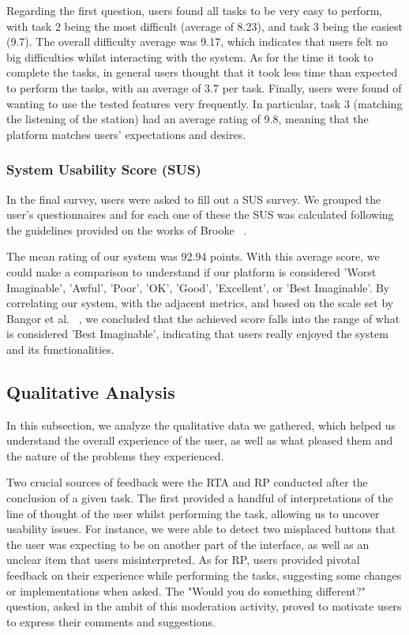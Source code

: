 {Regarding the first question, users found all tasks to be very easy to perform, with task 2 being the most difficult (average of 8.23), and task 3 being the easiest (9.7). The overall difficulty average was 9.17, which indicates that users felt no big difficulties whilst interacting with the system. As for the time it took to complete the tasks, in general users thought that it took less time than expected to perform the tasks, with an average of 3.7 per task. Finally, users were found of wanting to use the tested features very frequently. In particular, task 3 (matching the listening of the station) had an average rating of 9.8, meaning that the platform matches users' expectations and desires.

\subsubsection{System Usability Score (SUS)}

In the final survey, users were asked to fill out a \ac{SUS} survey. We grouped the user’s questionnaires and for each one of these the \ac{SUS} was calculated following the guidelines provided on the works of Brooke ~\cite{Kusic2018}.

The mean rating of our system was 92.94 points. With this average score, we could make a comparison to understand if our platform is considered 'Worst Imaginable', 'Awful', 'Poor', 'OK', 'Good', 'Excellent', or 'Best Imaginable'. By correlating our system, with the adjacent metrics, and based on the scale set by Bangor et al. ~\cite{Donovan2018}, we concluded that the achieved score falls into the range of what is considered 'Best Imaginable', indicating that users really enjoyed the system and its functionalities.


\subsection{Qualitative Analysis}

In this subsection, we analyze the qualitative data we gathered, which helped us understand the overall experience of the user, as well as what pleased them and the nature of the problems they experienced.

Two crucial sources of feedback were the \ac{RTA} and \ac{RP} conducted after the conclusion of a given task. The first provided a handful of interpretations of the line of thought of the user whilst performing the task, allowing us to uncover usability issues. For instance, we were able to detect two misplaced buttons that the user was expecting to be on another part of the interface, as well as an unclear item that users misinterpreted. As for \ac{RP}, users provided pivotal feedback on their experience while performing the tasks, suggesting some changes or implementations when asked. The "Would you do something different?" question, asked in the ambit of this moderation activity, proved to motivate users to express their comments and suggestions.

}
